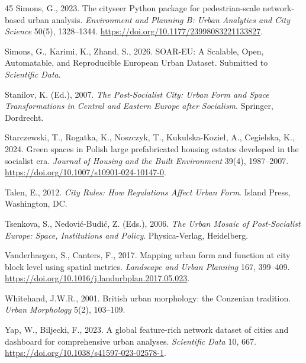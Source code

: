 \documentclass[review,authoryear]{elsarticle}
\begin{document}
\begin{thebibliography}{45}
  Simons, G., 2023.
  \newblock The cityseer Python package for pedestrian-scale network-based urban analysis.
  \newblock \emph{Environment and Planning B: Urban Analytics and City Science} 50(5), 1328--1344.
  \newblock \url{https://doi.org/10.1177/23998083221133827}.

  Simons, G., Karimi, K., Zhand, S., 2026.
  \newblock SOAR-EU: A Scalable, Open, Automatable, and Reproducible European Urban Dataset.
  \newblock Submitted to \emph{Scientific Data}.

  Stanilov, K. (Ed.), 2007.
  \newblock \emph{The Post-Socialist City: Urban Form and Space Transformations in Central and Eastern Europe after Socialism}.
  \newblock Springer, Dordrecht.

  Starczewski, T., Rogatka, K., Noszczyk, T., Kukulska-Kozie\l{}, A., Cegielska, K., 2024.
  \newblock Green spaces in Polish large prefabricated housing estates developed in the socialist era.
  \newblock \emph{Journal of Housing and the Built Environment} 39(4), 1987--2007.
  \newblock \url{https://doi.org/10.1007/s10901-024-10147-0}.

  Talen, E., 2012.
  \newblock \emph{City Rules: How Regulations Affect Urban Form}.
  \newblock Island Press, Washington, DC.

  Tsenkova, S., Nedovi\'{c}-Budi\'{c}, Z. (Eds.), 2006.
  \newblock \emph{The Urban Mosaic of Post-Socialist Europe: Space, Institutions and Policy}.
  \newblock Physica-Verlag, Heidelberg.

  Vanderhaegen, S., Canters, F., 2017.
  \newblock Mapping urban form and function at city block level using spatial metrics.
  \newblock \emph{Landscape and Urban Planning} 167, 399--409.
  \newblock \url{https://doi.org/10.1016/j.landurbplan.2017.05.023}.

  Whitehand, J.W.R., 2001.
  \newblock British urban morphology: the Conzenian tradition.
  \newblock \emph{Urban Morphology} 5(2), 103--109.

  Yap, W., Biljecki, F., 2023.
  \newblock A global feature-rich network dataset of cities and dashboard for comprehensive urban analyses.
  \newblock \emph{Scientific Data} 10, 667.
  \newblock \url{https://doi.org/10.1038/s41597-023-02578-1}.

\end{thebibliography}
\end{document}
